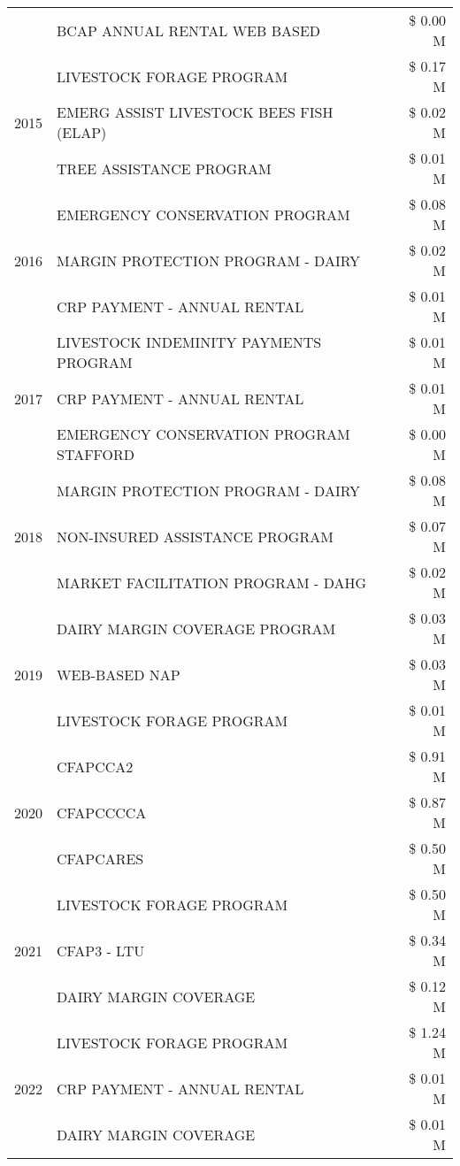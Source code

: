 \begin{tabular}{llr}
 & BCAP ANNUAL RENTAL WEB BASED & \$ 0.00 M \\
\cline{1-3}
\multirow[t]{3}{*}{2015} & LIVESTOCK FORAGE PROGRAM & \$ 0.17 M \\
 & EMERG ASSIST LIVESTOCK BEES FISH (ELAP) & \$ 0.02 M \\
 & TREE ASSISTANCE PROGRAM & \$ 0.01 M \\
\cline{1-3}
\multirow[t]{3}{*}{2016} & EMERGENCY CONSERVATION PROGRAM & \$ 0.08 M \\
 & MARGIN PROTECTION PROGRAM - DAIRY & \$ 0.02 M \\
 & CRP PAYMENT - ANNUAL RENTAL & \$ 0.01 M \\
\cline{1-3}
\multirow[t]{3}{*}{2017} & LIVESTOCK INDEMINITY PAYMENTS PROGRAM & \$ 0.01 M \\
 & CRP PAYMENT - ANNUAL RENTAL & \$ 0.01 M \\
 & EMERGENCY CONSERVATION PROGRAM STAFFORD & \$ 0.00 M \\
\cline{1-3}
\multirow[t]{3}{*}{2018} & MARGIN PROTECTION PROGRAM - DAIRY & \$ 0.08 M \\
 & NON-INSURED ASSISTANCE PROGRAM & \$ 0.07 M \\
 & MARKET FACILITATION PROGRAM - DAHG & \$ 0.02 M \\
\cline{1-3}
\multirow[t]{3}{*}{2019} & DAIRY MARGIN COVERAGE PROGRAM & \$ 0.03 M \\
 & WEB-BASED NAP & \$ 0.03 M \\
 & LIVESTOCK FORAGE PROGRAM & \$ 0.01 M \\
\cline{1-3}
\multirow[t]{3}{*}{2020} & CFAPCCA2 & \$ 0.91 M \\
 & CFAPCCCCA & \$ 0.87 M \\
 & CFAPCARES & \$ 0.50 M \\
\cline{1-3}
\multirow[t]{3}{*}{2021} & LIVESTOCK FORAGE PROGRAM & \$ 0.50 M \\
 & CFAP3 - LTU & \$ 0.34 M \\
 & DAIRY MARGIN COVERAGE & \$ 0.12 M \\
\cline{1-3}
\multirow[t]{3}{*}{2022} & LIVESTOCK FORAGE PROGRAM & \$ 1.24 M \\
 & CRP PAYMENT - ANNUAL RENTAL & \$ 0.01 M \\
 & DAIRY MARGIN COVERAGE & \$ 0.01 M \\
\cline{1-3}
\bottomrule
\end{tabular}

